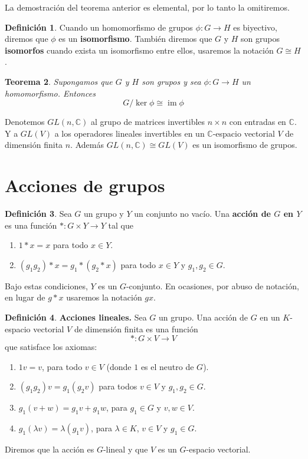\documentclass[12pt]{book}
\newtheorem{theorem}{Teorema}[section]
\theoremstyle{definition}
\newtheorem{definition}[theorem]{Definición}
\DeclareMathOperator{\im}{im}
\newcounter{in}
\newcounter{ini}
\begin{document}
La demostración del teorema anterior es elemental, por lo tanto la omitiremos.

\begin{definition}
  Cuando un homomorfismo de grupos $\phi:G\rightarrow H$ es biyectivo,
  diremos que $\phi$ es un  \textbf{isomorfismo}. También diremos que
  $G$ y $H$ son grupos  \textbf{isomorfos} cuando exista un
    isomorfismo entre ellos, usaremos la notación $G\cong H$.
\end{definition}

\begin{theorem}
  Supongamos que $G$ y $H$ son grupos y sea $\phi:G\rightarrow H$ un
  homomorfismo. Entonces $$G/\ker \phi\cong \im \phi$$ 
\end{theorem}

  Denotemos $GL(n,\mathbb{C})$ al grupo de matrices
  invertibles  $n \times n$ con entradas en $\mathbb{C}$.  
  Y a $GL(V)$ a los operadores lineales invertibles en un
  $\mathbb{C}$-espacio vectorial $V$ de dimensión finita $n$.
  Además $GL(n,\mathbb{C})\cong GL(V)$ es un isomorfismo de grupos.

\section{Acciones de grupos}

\begin{definition}
  Sea $G$ un grupo y $Y$ un conjunto no vacío. Una  \textbf{acción de $G$
  en $Y$} es una función $*:G \times Y \rightarrow Y$ tal que
\begin{enumerate}
\item $1*x=x$ para todo $x\in Y.$
\item $(g_{1}g_{2})*x=g_{1}*(g_{2}*x)$ para todo $x\in Y$ y $g_{1},g_{2}\in G.$
\end{enumerate}
   Bajo estas condiciones, $Y$ es un $G$-conjunto. En ocasiones, por
   abuso de notación, en lugar de $g*x$ usaremos la notación $gx.$
\end{definition}

\begin{definition}\textbf{Acciones lineales.}
  Sea $G$ un grupo. Una acción de $G$ en un $K$-espacio
  vectorial $V$ de dimensión finita es una función
 $$*:G\times V \rightarrow V $$
que satisface los axiomas:
\begin{enumerate}
\item $1v=v$, para todo $v\in V$ (donde $1$ es el neutro de $G$).
\item $(g_{1}g_{2})v=g_{1}(g_{2}v)$ para todos $v\in V$ y
  $g_{1},g_{2}\in G$.
\item $g_{1}(v+w)=g_{1}v+g_{1}w$, para $g_{1}\in G$ y $v,w \in V .$
\item $g_{1}(\lambda v)=\lambda(g_{1}v)$, para $\lambda \in K$,
  $v\in V$ y $g_{1}\in G.$
\end{enumerate}
Diremos que la acción es $G$-lineal y que $V$ es un $G$-espacio
vectorial.
\end{definition} 
\end{document}

